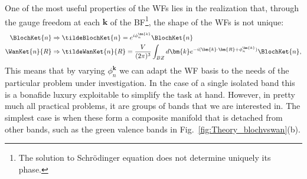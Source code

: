 One of the most useful properties of the WFs lies in the realization that, through the gauge freedom at each $\bm{k}$ of the BF\footnote{The solution to Schr\"odinger equation does not determine uniquely its phase.}, the shape of the WFs is not unique:
\begin{align}
	\BlochKet{n} &\Rightarrow \tildeBlochKet{n} = e^{i \phi_n^{\bm{k}}} \BlochKet{n} \\
	\WanKet{n}{R} &\Rightarrow \tildeWanKet{n}{R} = \frac{V}{(2\pi)^3} \int_{BZ} d \bm{k} e^{-i (\bm{k} \cdot \bm{R} + \phi_n^{\bm{k}})} \BlochKet{n},
\end{align}
This means that by varying $\phi_n^{\bm{k}}$ we can adapt the WF basis to the needs of the particular problem under investigation.
In the case of a single isolated band this is a bonafide luxury exploitable to simplify the task at hand.
However, in pretty much all practical problems, it are groups of bands that we are interested in.
The simplest case is when these form a composite manifold that is detached from other bands, such as the green valence bands in Fig.~\ref{fig:Theory_blochvswan}(b).

